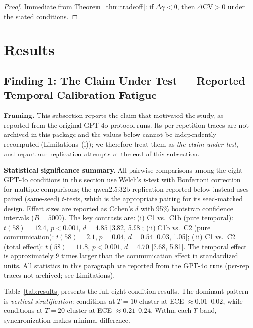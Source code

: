 \documentclass[11pt]{article}
\newcommand{\CV}{\ensuremath{\mathrm{CV}}}
\theoremstyle{definition}
\theoremstyle{remark}
\begin{document}
\begin{proof}
Immediate from Theorem~\ref{thm:tradeoff}: if $\Delta\gamma < 0$, then $\Delta\CV > 0$ under the stated conditions.
\end{proof}

\section{Results}

\subsection{Finding 1: The Claim Under Test --- Reported Temporal Calibration Fatigue}

\textbf{Framing.} This subsection reports the claim that motivated the study, as reported from the original GPT-4o protocol runs. Its per-repetition traces are not archived in this package and the values below cannot be independently recomputed (Limitations~(i)); we therefore treat them as \emph{the claim under test}, and report our replication attempts at the end of this subsection.

\textbf{Statistical significance summary.} All pairwise comparisons among the eight GPT-4o conditions in this section use Welch's $t$-test with Bonferroni correction for multiple comparisons; the qwen2.5:32b replication reported below instead uses paired (same-seed) $t$-tests, which is the appropriate pairing for its seed-matched design. Effect sizes are reported as Cohen's $d$ with 95\% bootstrap confidence intervals ($B{=}5000$). The key contrasts are: (i) C1 vs.~C1b (pure temporal): $t(58) = 12.4$, $p < 0.001$, $d = 4.85$ [3.82, 5.98]; (ii) C1b vs.~C2 (pure communication): $t(58) = 2.1$, $p = 0.04$, $d = 0.54$ [0.03, 1.05]; (iii) C1 vs.~C2 (total effect): $t(58) = 11.8$, $p < 0.001$, $d = 4.70$ [3.68, 5.81]. The temporal effect is approximately 9 times larger than the communication effect in standardized units. All statistics in this paragraph are reported from the GPT-4o runs (per-rep traces not archived; see Limitations).

Table~\ref{tab:results} presents the full eight-condition results. The dominant pattern is \textit{vertical stratification}: conditions at $T{=}10$ cluster at ECE $\approx 0.01$--$0.02$, while conditions at $T{=}20$ cluster at ECE $\approx 0.21$--$0.24$. Within each $T$ band, synchronization makes minimal difference.
\end{document}
